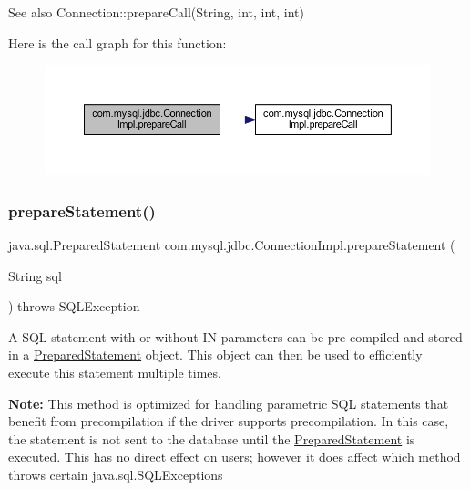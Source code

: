 \begin{DoxySeeAlso}{See also}
Connection\+::prepare\+Call(\+String, int, int, int) 
\end{DoxySeeAlso}
Here is the call graph for this function\+:\nopagebreak
\begin{figure}[H]
\begin{center}
\leavevmode
\includegraphics[width=350pt]{classcom_1_1mysql_1_1jdbc_1_1_connection_impl_ac6d1a47de58f0636b2b921aa47f8bfa1_cgraph}
\end{center}
\end{figure}
\mbox{\label{classcom_1_1mysql_1_1jdbc_1_1_connection_impl_ae88b1d09280bb34e6e52efff869ce61f}} 
\subsubsection{\texorpdfstring{prepare\+Statement()}{prepareStatement()}\hspace{0.1cm}{\footnotesize\ttfamily [1/6]}}
{\footnotesize\ttfamily java.\+sql.\+Prepared\+Statement com.\+mysql.\+jdbc.\+Connection\+Impl.\+prepare\+Statement (\begin{DoxyParamCaption}\item[{String}]{sql }\end{DoxyParamCaption}) throws S\+Q\+L\+Exception}

A S\+QL statement with or without IN parameters can be pre-\/compiled and stored in a \mbox{\hyperlink{classcom_1_1mysql_1_1jdbc_1_1_prepared_statement}{Prepared\+Statement}} object. This object can then be used to efficiently execute this statement multiple times. 

{\bfseries Note\+:} This method is optimized for handling parametric S\+QL statements that benefit from precompilation if the driver supports precompilation. In this case, the statement is not sent to the database until the \mbox{\hyperlink{classcom_1_1mysql_1_1jdbc_1_1_prepared_statement}{Prepared\+Statement}} is executed. This has no direct effect on users; however it does affect which method throws certain java.\+sql.\+S\+Q\+L\+Exceptions 

